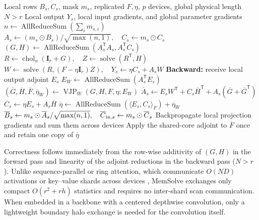 \documentclass[10pt,twocolumn]{article}
\let\draftsmall\small
\renewcommand{\small}{\draftsmall\fontsize{9}{10}\selectfont}
\newcommand{\I}{\mathbf{I}}
\newcommand{\T}{\mathsf{T}}
\newcommand{\Solve}{\operatorname{solve}}
\newcommand{\Chol}{\operatorname{chol}_{u}}
\begin{document}
\begin{algorithm}[!ht]
\caption{Exact sequence-parallel MemSolve (one sample and head)}
\label{alg:sequence-parallel}
\small
\begin{algorithmic}[1]
\Require Local rows $B_s,C_s$, mask $m_s$, replicated $F,\eta$, $p$ devices,
 global physical length $N>r$
\Ensure Local output $Y_s$, local input gradients, and global parameter gradients
\State $n\gets\operatorname{AllReduceSum}(\sum_i m_{s,i})$
\State $A_s\gets(m_s\odot B_s)/\sqrt{\max(n,1)},\quad C_s\gets m_s\odot C_s$
\State $(G,H)\gets\operatorname{AllReduceSum}(A_s^\T A_s,A_s^\T C_s)$
\State $R\gets\Chol(\I_r+G),\quad Z\gets\Solve(R^\T,H)$
\State $W\gets\Solve(R,(F-\eta\I_r)Z),\quad Y_s\gets\eta C_s+A_sW$
\State \textbf{Backward:} receive local output adjoint $E_s$
\State $E_W\gets\operatorname{AllReduceSum}(A_s^\T E_s)$
\State $(\overline G,\overline H,\overline F,\overline\eta_W)
  \gets\operatorname{VJP}_W(G,H,F,\eta;E_W)$
\State $\overline A_s\gets E_sW^\T+C_s\overline H^\T+A_s(\overline G+\overline G^\T)$
\State $\overline C_s\gets\eta E_s+A_s\overline H$
\State $\overline\eta\gets\operatorname{AllReduceSum}(\langle E_s,C_s\rangle_F)+\overline\eta_W$
\State $\overline B_s\gets m_s\odot\overline A_s/\sqrt{\max(n,1)},\quad
 \overline C_{{\rm in},s}\gets m_s\odot\overline C_s$
\State Backpropagate local projection gradients and sum them across devices
\State Apply the shared-core adjoint to $\overline F$ once and retain one copy of $\overline\eta$
\end{algorithmic}
\end{algorithm}

Correctness follows immediately from the row-wise additivity of $(G,H)$ in
the forward pass and linearity of the adjoint reductions in the backward pass
($N>r$).
Unlike sequence-parallel or ring attention, which communicate $O(ND)$
activations or key--value shards across devices
\cite{korthikanti2023reducing,liu2024ring}, MemSolve exchanges only compact
$O(r^2+rh)$ statistics and requires no inter-shard scan communication.
When embedded in a backbone with a centered depthwise convolution, only a
lightweight boundary halo exchange is needed for the convolution itself.
\end{document}
